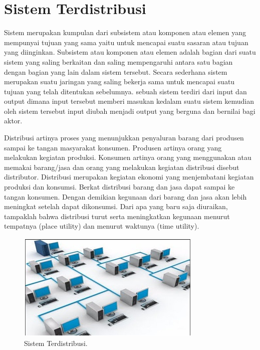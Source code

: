 \documentclass{jtetiproposalskripsi}
\begin{document}
\section{Sistem Terdistribusi}
	 Sistem merupakan kumpulan dari subsistem atau komponen atau elemen yang mempunyai tujuan yang sama yaitu untuk mencapai suatu sasaran atau tujuan yang diinginkan. Subsistem atau komponen atau elemen adalah bagian dari suatu sistem yang saling berkaitan dan saling mempengaruhi antara satu bagian dengan bagian yang lain dalam sistem tersebut. Secara sederhana sistem merupakan suatu jaringan yang saling bekerja sama untuk mencapai suatu tujuan yang telah ditentukan sebelumnya. sebuah sistem terdiri dari input dan output dimana input tersebut memberi masukan kedalam suatu sistem kemudian oleh sistem tersebut input diubah menjadi output yang berguna dan bernilai bagi aktor.
	 
Distribusi artinya proses yang menunjukkan penyaluran barang dari produsen sampai ke tangan masyarakat konsumen. Produsen artinya orang yang melakukan kegiatan produksi. Konsumen artinya orang yang menggunakan atau memakai barang/jasa dan orang yang melakukan kegiatan distribusi disebut distributor. Distribusi merupakan kegiatan ekonomi yang menjembatani kegiatan produksi dan konsumsi. Berkat distribusi barang dan jasa dapat sampai ke tangan konsumen. Dengan demikian kegunaan dari barang dan jasa akan lebih meningkat setelah dapat dikonsumsi. Dari apa yang baru saja diuraikan, tampaklah bahwa distribusi turut serta meningkatkan kegunaan menurut tempatnya (place utility) dan menurut waktunya (time utility).

\begin{figure}[ht!]
  \centering
    \includegraphics{gambar/1}
    \caption{Sistem Terdistribusi.}
    \label{wsn}
\end{figure}
\end{document}
